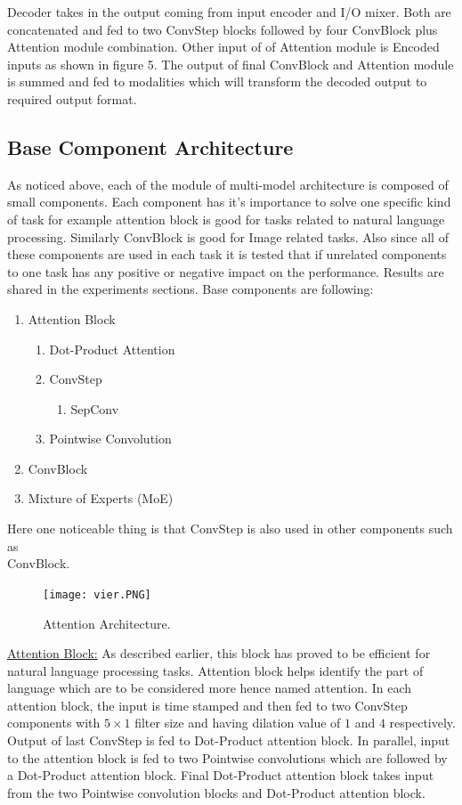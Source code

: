 \documentclass[12pt]{article}
\begin{document}
Decoder takes in the output coming from input encoder and I/O mixer. Both are concatenated and fed to two ConvStep blocks followed by four ConvBlock plus Attention module combination. Other input of of Attention module is Encoded inputs as shown in figure 5. The output of final ConvBlock and Attention module is summed and fed to modalities which will transform the decoded output to required output format.
\subsection{Base Component Architecture}
As noticed above, each of the module of multi-model architecture is composed of small components. Each component has it's importance to solve one specific kind of task for example attention block is good for tasks related to natural language processing. Similarly ConvBlock is good for Image related tasks. Also since all of these components are used in each task it is tested that if unrelated components to one task has any positive or negative impact on the performance. Results are shared in the experiments sections. Base components are following:
\begin{enumerate}
\item{Attention Block}
\begin{enumerate}
\item{Dot-Product Attention}
\item{ConvStep}
\begin{enumerate}
\item{SepConv}
\end{enumerate}
\item{Pointwise Convolution}
\end{enumerate}
\item{ConvBlock}
\item{Mixture of Experts (MoE)}
\end{enumerate}
Here one noticeable thing is that ConvStep is also used in other components such as \\ConvBlock.
\begin{center}
\begin{figure}[h]
  \centering
  \begin{minipage}[b]{1.0\textwidth}
    \centering
    \texttt{[image: vier.PNG]}
      \centering
    \caption{Attention Architecture. \cite{KaiserGSVPJU17}}
  \end{minipage}
\end{figure}
\end{center}
\underline{Attention Block:} As described earlier, this block has proved to be efficient for natural language processing tasks. Attention block helps identify the part of language which are to be considered more hence named attention. In each attention block, the input is time stamped and then fed to two ConvStep components with $5 \times 1$ filter size and having dilation value of $1$ and $4$ respectively. Output of last ConvStep is fed to Dot-Product attention block. In parallel, input to the attention block is fed to two Pointwise convolutions which are followed by a Dot-Product attention block. Final Dot-Product attention block takes input from the two Pointwise convolution blocks and Dot-Product attention block.
\end{document}
